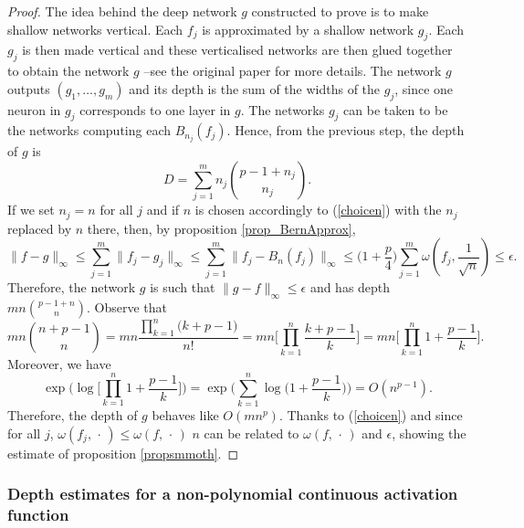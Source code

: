\documentclass[anon,12pt]{colt2021} %
\begin{document}
\begin{proof}
The idea behind the deep network $g$ constructed to prove \citep[Theorem 3.2]{kidger2019universal} is to make shallow networks vertical. Each $f_{j}$ is approximated by a shallow network $g_{j}$. Each $g_{j}$ is then made vertical and these verticalised networks are then glued together to obtain the network $g$ --see the original paper for more details. The network $g$ outputs $(g_{1}, \dots , g_{m})$ and its depth is the sum of the widths of the $g_{j}$, since one neuron in $g_{j}$ corresponds to one layer in $g$. The networks $g_{j}$ can be taken to be the networks computing each $B_{n_{j}}(f_{j})$. Hence, from the previous step, the depth of $g$ is
\begin{equation*}
    D = \sum_{j=1}^{m}  n_{j} 
    \binom{p -1 +n_{j} }{n_{j}}
    .
\end{equation*}
If we set $n_{j}=n$ for all $j$ and if $n$ is chosen accordingly to (\ref{choicen}) with the $n_{j}$ replaced by $n$ there, then, by proposition \ref{prop_BernApprox},
\begin{equation*}
    \| f - g \|_{\infty} \leq \sum_{j=1}^{m} \| f_{j} - g_{j} \|_{\infty} 
    \leq \sum_{j=1}^{m} \| f_{j} - B_{n}(f_{j}) \|_{\infty} 
    \leq \bigg( 1 + \frac{p}{4} \bigg) \sum_{j=1}^{m} \omega(f_{j}, \frac{1}{\sqrt{n}})
    \leq \epsilon .
\end{equation*}
Therefore, the network $g$ is such that $\| g -f \|_{\infty} \leq \epsilon$ and has depth 
$mn
\binom{p-1 +n}{n}
$. Observe that
\begin{equation*}
    m n 
    \binom{n+p-1}{n}
    = mn \frac{\prod_{k=1}^{n}\big( k+p-1 \big)}{n !} 
    = mn \bigg[ \prod_{k=1}^{n} \frac{k+p-1}{k} \bigg]  
    = mn \bigg[ \prod_{k=1}^{n} 1+ \frac{p-1}{k} \bigg].
\end{equation*}
Moreover, we have
\begin{equation*}
    \exp \bigg( \log \bigg[ \prod_{k=1}^{n} 1+\frac{p-1}{k} \bigg] \bigg) = \exp \bigg( \sum_{k=1}^{n} \log \big( 1 + \frac{p-1}{k}\big) \bigg)
    = O(n^{p-1}).
\end{equation*}
Therefore, the depth of $g$ behaves like $O(mn^{p})$. Thanks to (\ref{choicen}) and since for all $j$, $\omega(f_{j}, \, \cdot \,) \leq \omega(f, \, \cdot \,)$ $n$ can be related to $\omega(f, \, \cdot \,)$ and $\epsilon$, showing the estimate of proposition \ref{propsmmoth}.

\end{proof}

\subsubsection{Depth estimates for a non-polynomial continuous activation function}
\end{document}
